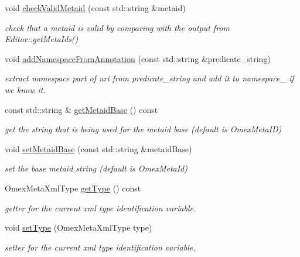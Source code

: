 \begin{DoxyCompactItemize}
\mbox{\label{classomexmeta_1_1Editor_a790458ef32f01ce0a6fd87bf14bed81a}} 
void \hyperlink{classomexmeta_1_1Editor_a790458ef32f01ce0a6fd87bf14bed81a}{check\+Valid\+Metaid} (const std\+::string \&metaid)
\begin{DoxyCompactList}\small\item\em check that a metaid is valid by comparing with the output from Editor\+::get\+Meta\+Ids() \end{DoxyCompactList}\item 
\mbox{\label{classomexmeta_1_1Editor_a3fef7f1c38949b50239a9a07cc327d67}} 
void \hyperlink{classomexmeta_1_1Editor_a3fef7f1c38949b50239a9a07cc327d67}{add\+Namespace\+From\+Annotation} (const std\+::string \&predicate\+\_\+string)
\begin{DoxyCompactList}\small\item\em extract namespace part of uri from  predicate\+\_\+string and add it to namespace\+\_\+ if we know it. \end{DoxyCompactList}\item 
const std\+::string \& \hyperlink{classomexmeta_1_1Editor_af987e450e4bf9d75391ad3f5ac6233f6}{get\+Metaid\+Base} () const
\begin{DoxyCompactList}\small\item\em get the string that is being used for the metaid base (default is Omex\+Meta\+ID) \end{DoxyCompactList}\item 
void \hyperlink{classomexmeta_1_1Editor_a206feee18473abbeda5e4e55906e73eb}{set\+Metaid\+Base} (const std\+::string \&metaid\+Base)
\begin{DoxyCompactList}\small\item\em set the base metaid string (default is Omex\+Meta\+Id) \end{DoxyCompactList}\item 
Omex\+Meta\+Xml\+Type \hyperlink{classomexmeta_1_1Editor_a68ade6a293061a98243a3b2853e55a4b}{get\+Type} () const
\begin{DoxyCompactList}\small\item\em getter for the current xml type identification variable. \end{DoxyCompactList}\item 
void \hyperlink{classomexmeta_1_1Editor_a3e2c493ed5034a15e6915b7b649b58a3}{set\+Type} (Omex\+Meta\+Xml\+Type type)
\begin{DoxyCompactList}\small\item\em setter for the current xml type identification variable. \end{DoxyCompactList}\item 

\end{DoxyCompactItemize}
